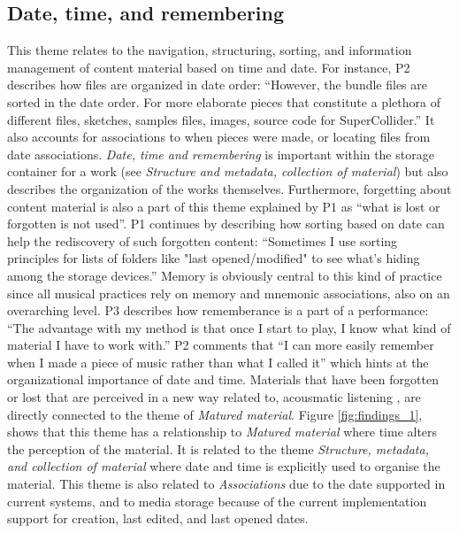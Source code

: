 \documentclass[runningheads,a4paper]{cmmr2023}
\begin{document}
\subsection{Date, time, and remembering}
\label{sec:date}
This theme relates to the navigation, structuring, sorting, and information management of content material based on time and date. For instance, P2 describes how files are organized in date order: “However, the bundle files are sorted in the date order. For more elaborate pieces that constitute a plethora of different files, sketches, samples files, images, source code for SuperCollider.” It also accounts for associations to when pieces were made, or locating files from date associations. \emph{Date, time and remembering} is important within the storage container for a work (see \emph{Structure and metadata, collection of material}) but also describes the organization of the works themselves. Furthermore, forgetting about content material is also a part of this theme explained by P1 as “what is lost or forgotten is not used”. P1 continues by describing how sorting based on date can help the rediscovery of such forgotten content: “Sometimes I use sorting principles for lists of folders like "last opened/modified" to see what's hiding among the storage devices.” Memory is obviously central to this kind of practice since all musical practices rely on memory and mnemonic associations, also on an overarching level. P3 describes how rememberance is a part of a performance: “The advantage with my method is that once I start to play, I know what kind of material I have to work with.” P2 comments that “I can more easily remember when I made a piece of music rather than what I called it” which hints at the organizational importance of date and time. Materials that have been forgotten or lost that are perceived in a new way related to, acousmatic listening \cite{Kane2014}, are directly connected to the theme of \emph{Matured material}. Figure \ref{fig:findings_1}, shows that this theme has a relationship to \emph{Matured material} where time alters the perception of the material. It is related to the theme \emph{Structure, metadata, and collection of material} where date and time is explicitly used to organise the material. This theme is also related to \emph{Associations} due to the date supported in current systems, and to media storage because of the current implementation support for creation, last edited, and last opened dates.
\end{document}
